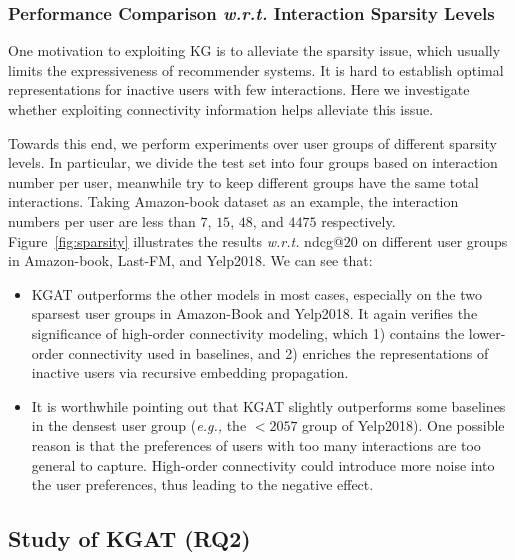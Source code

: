 \documentclass[sigconf]{acmart}
\newcommand{\eg}{\emph{e.g., }}
\newcommand{\wrt}{\emph{w.r.t. }}
\theoremstyle{definition}
\begin{document}
\subsubsection{\textbf{Performance Comparison \wrt Interaction Sparsity Levels}}\label{sec:sparsity}
One motivation to exploiting KG is to alleviate the sparsity issue, which usually limits the expressiveness of recommender systems.
It is hard to establish optimal representations for inactive users with few interactions.
Here we investigate whether exploiting connectivity information helps alleviate this issue.



Towards this end, we perform experiments over user groups of different sparsity levels.
In particular, we divide the test set into four groups based on interaction number per user, meanwhile try to keep different groups have the same total interactions.
Taking Amazon-book dataset as an example, the interaction numbers per user are less than $7$, $15$, $48$, and $4475$ respectively.
Figure~\ref{fig:sparsity} illustrates the results \wrt ndcg@$20$ on different user groups in Amazon-book, Last-FM, and Yelp2018.
We can see that:
\begin{itemize}[leftmargin=*]
    \item KGAT outperforms the other models in most cases, especially on the two sparsest user groups in Amazon-Book and Yelp2018.
    It again verifies the significance of high-order connectivity modeling, which 1) contains the lower-order connectivity used in baselines, and 2) enriches the representations of inactive users via recursive embedding propagation.
    
    




    \item It is worthwhile pointing out that KGAT slightly outperforms some baselines in the densest user group (\eg the $<2057$ group of Yelp2018). One possible reason is that the preferences of users with too many interactions are too general to capture. High-order connectivity could introduce more noise into the user preferences, thus leading to the negative effect.
\end{itemize}


\subsection{Study of KGAT (RQ2)}
\end{document}

